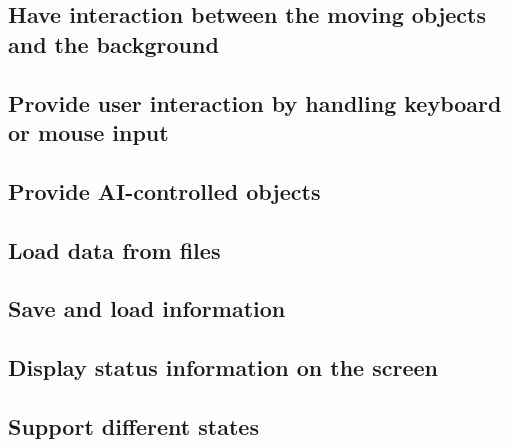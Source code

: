 \subsection{Have interaction between the moving objects and the background}

\subsection{Provide user interaction by handling keyboard or mouse input}

\subsection{Provide AI-controlled objects}

\subsection{Load data from files}

\subsection{Save and load information}

\subsection{Display status information on the screen}

\subsection{Support different states}